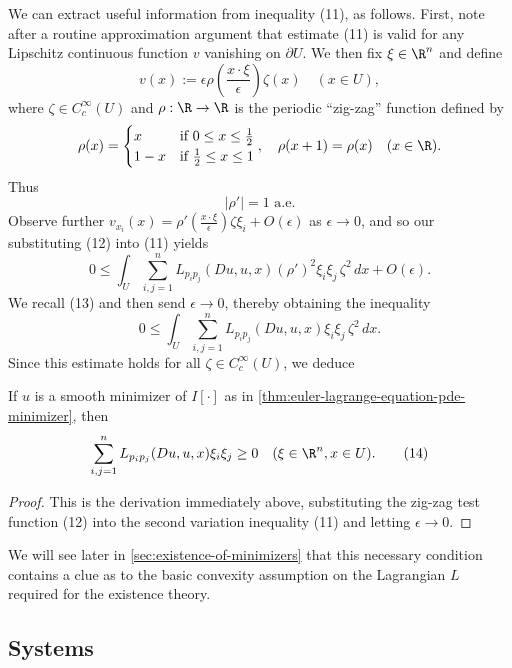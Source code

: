 We can extract useful information from inequality (11), as follows. First, note after a routine approximation argument that estimate (11) is valid for any Lipschitz continuous function $v$ vanishing on $\partial U$. We then fix $\xi \in \R^n$ and define
\[
v(x) := \epsilon\rho\left(\frac{x \cdot \xi}{\epsilon}\right)\zeta(x) \quad (x \in U),
\tag{12}
\]
where $\zeta \in C_c^\infty(U)$ and $\rho: \R \to \R$ is the periodic ``zig-zag'' function defined by
\[
\rho(x) = \begin{cases} x & \text{if } 0 \leq x \leq \frac{1}{2} \\ 1-x & \text{if } \frac{1}{2} \leq x \leq 1 \end{cases}, \quad \rho(x+1) = \rho(x) \quad (x \in \R).
\]
Thus
\[
|\rho'| = 1 \text{ a.e.}
\tag{13}
\]
Observe further $v_{x_i}(x) = \rho'\left(\frac{x \cdot \xi}{\epsilon}\right)\zeta \xi_i + O(\epsilon)$ as $\epsilon \to 0$, and so our substituting (12) into (11) yields
\[
0 \leq \int_U \sum_{i,j=1}^n L_{p_i p_j}(Du, u, x)(\rho')^2 \xi_i \xi_j\, \zeta^2\, dx + O(\epsilon).
\]
We recall (13) and then send $\epsilon \to 0$, thereby obtaining the inequality
\[
0 \leq \int_U \sum_{i,j=1}^n L_{p_i p_j}(Du, u, x)\xi_i \xi_j\, \zeta^2\, dx.
\]
Since this estimate holds for all $\zeta \in C_c^\infty(U)$, we deduce

\begin{proposition}
\label{prop:second-variation-convexity-necessary-condition}
If $u$ is a smooth minimizer of $I[\cdot]$ as in \cref{thm:euler-lagrange-equation-pde-minimizer}, then
\[
\sum_{i,j=1}^n L_{p_i p_j}(Du, u, x)\xi_i \xi_j \geq 0 \quad (\xi \in \R^n, x \in U).
\tag{14}
\]
\end{proposition}
\begin{proof}
This is the derivation immediately above, substituting the zig-zag test function (12) into the second variation inequality (11) and letting $\epsilon \to 0$.
\end{proof}

We will see later in \cref{sec:existence-of-minimizers} that this necessary condition contains a clue as to the basic convexity assumption on the Lagrangian $L$ required for the existence theory.

\subsection{Systems}
\label{sec:systems-calculus-of-variations}

